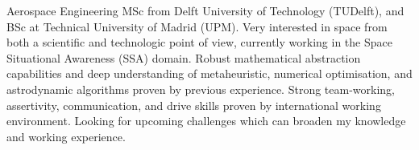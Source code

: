 \documentclass[letter,10pt]{article}
\begin{document}
\justifying

Aerospace Engineering MSc from Delft University of Technology (TUDelft), and BSc at Technical University of Madrid (UPM). Very interested in space from both a scientific and technologic point of view, currently working in the Space Situational Awareness (SSA) domain. Robust mathematical abstraction capabilities and deep understanding of metaheuristic, numerical optimisation, and astrodynamic algorithms proven by previous experience. Strong team-working, assertivity, communication, and drive skills proven by international working environment. Looking for upcoming challenges which can broaden my knowledge and working experience.
\end{document}
